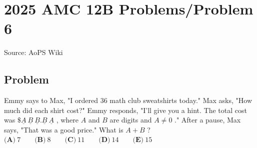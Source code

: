 \documentclass[12pt]{article}
\begin{document}
\section*{{2025 AMC 12B Problems/Problem 6}}
Source: AoPS Wiki

\subsection*{Problem}
Emmy says to Max, "I ordered 36 math club sweatshirts today." Max asks, "How much did each shirt cost?" Emmy responds, "I'll give you a hint. The total cost was $\$ \underline A~\underline B~\underline B.\underline B~\underline A$ , where $A$ and $B$ are digits and $A \neq 0$ ." After a pause, Max says, "That was a good price." What is $A + B$ ? $\textbf{(A)}~7 \qquad \textbf{(B)}~8 \qquad \textbf{(C)}~11 \qquad \textbf{(D)}~14 \qquad \textbf{(E)}~15$
\end{document}
